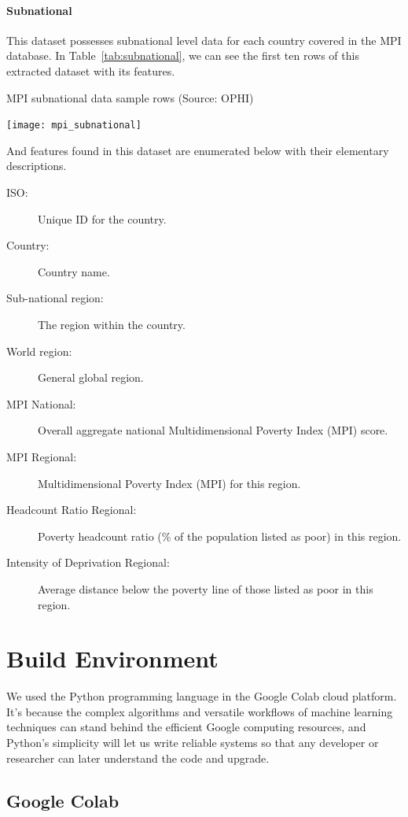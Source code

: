 \documentclass{swfuthesise}
\begin{document}
\paragraph{Subnational}

This dataset possesses subnational level data for each country covered in the MPI database. In Table~\ref{tab:subnational}, we can see the first ten rows of this extracted dataset with its features. 

\begin{table}[ht]
  \centering
  \caption{MPI subnational data sample rows (Source: OPHI)\label{tab:subnational}}
  \texttt{[image: mpi\_subnational]}
\end{table}

And features found in this dataset are enumerated below with their elementary descriptions.

\begin{description}
\item[ISO:] Unique ID for the country.
\item[Country:] Country name.
\item[Sub-national region:] The region within the country.
\item[World region:] General global region.
\item[MPI National:] Overall aggregate national Multidimensional Poverty Index (MPI) score.
\item[MPI Regional:] Multidimensional Poverty Index (MPI) for this region.
\item[Headcount Ratio Regional:] Poverty headcount ratio (\% of the population listed as poor) in this region.
\item[Intensity of Deprivation Regional:] Average distance below the poverty line of those listed as poor in this region.
\end{description}

\section{Build Environment}

We used the Python programming language in the Google Colab cloud platform. It's because the complex algorithms and versatile workflows of machine learning techniques can stand behind the efficient Google computing resources, and Python's simplicity will let us write reliable systems so that any developer or researcher can later understand the code and upgrade.

\subsection{Google Colab}
\end{document}
